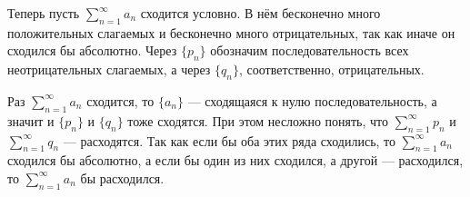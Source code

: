 \documentclass[a4paper, 12pt]{article}
\begin{document}
	
	Теперь пусть $\sum\limits_{n=1}^{\infty}a_n$ сходится условно. В нём бесконечно много положительных слагаемых и бесконечно много отрицательных, так как иначе он сходился бы абсолютно. Через $\{p_n\}$ обозначим последовательность всех неотрицательных слагаемых, а через $\{q_n\}$, соответственно, отрицательных. 
	
	Раз $\sum\limits_{n=1}^{\infty}a_n$ сходится, то $\{a_n\}$ --- сходящаяся к нулю последовательность, а значит и $\{p_n\}$ и $\{q_n\}$ тоже сходятся.
	При этом несложно понять, что $\sum\limits_{n=1}^{\infty}p_n$ и $\sum\limits_{n=1}^{\infty}q_n$ --- расходятся. Так как если бы оба этих ряда сходились, то $\sum\limits_{n=1}^{\infty}a_n$ сходился бы абсолютно, а если бы один из них сходился, а другой --- расходился, то  $\sum\limits_{n=1}^{\infty}a_n$ бы расходился.
	
\end{document}

